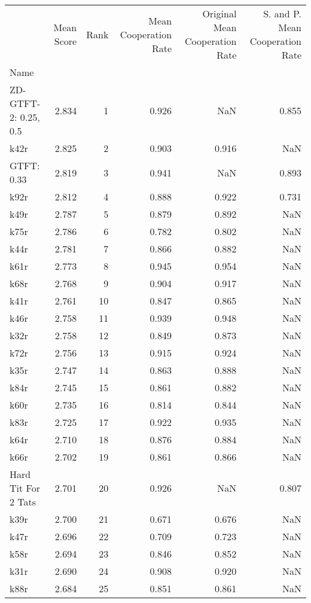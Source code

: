 \begin{tabular}{lrrrrr}
\toprule
 & Mean Score & Rank & Mean Cooperation Rate & Original Mean Cooperation Rate & S. and P. Mean Cooperation Rate \\
Name &  &  &  &  &  \\
\midrule
ZD-GTFT-2: 0.25, 0.5 & 2.834 & 1 & 0.926 & NaN & 0.855 \\
k42r & 2.825 & 2 & 0.903 & 0.916 & NaN \\
GTFT: 0.33 & 2.819 & 3 & 0.941 & NaN & 0.893 \\
k92r & 2.812 & 4 & 0.888 & 0.922 & 0.731 \\
k49r & 2.787 & 5 & 0.879 & 0.892 & NaN \\
k75r & 2.786 & 6 & 0.782 & 0.802 & NaN \\
k44r & 2.781 & 7 & 0.866 & 0.882 & NaN \\
k61r & 2.773 & 8 & 0.945 & 0.954 & NaN \\
k68r & 2.768 & 9 & 0.904 & 0.917 & NaN \\
k41r & 2.761 & 10 & 0.847 & 0.865 & NaN \\
k46r & 2.758 & 11 & 0.939 & 0.948 & NaN \\
k32r & 2.758 & 12 & 0.849 & 0.873 & NaN \\
k72r & 2.756 & 13 & 0.915 & 0.924 & NaN \\
k35r & 2.747 & 14 & 0.863 & 0.888 & NaN \\
k84r & 2.745 & 15 & 0.861 & 0.882 & NaN \\
k60r & 2.735 & 16 & 0.814 & 0.844 & NaN \\
k83r & 2.725 & 17 & 0.922 & 0.935 & NaN \\
k64r & 2.710 & 18 & 0.876 & 0.884 & NaN \\
k66r & 2.702 & 19 & 0.861 & 0.866 & NaN \\
Hard Tit For 2 Tats & 2.701 & 20 & 0.926 & NaN & 0.807 \\
k39r & 2.700 & 21 & 0.671 & 0.676 & NaN \\
k47r & 2.696 & 22 & 0.709 & 0.723 & NaN \\
k58r & 2.694 & 23 & 0.846 & 0.852 & NaN \\
k31r & 2.690 & 24 & 0.908 & 0.920 & NaN \\
k88r & 2.684 & 25 & 0.851 & 0.861 & NaN \\
\bottomrule
\end{tabular}
